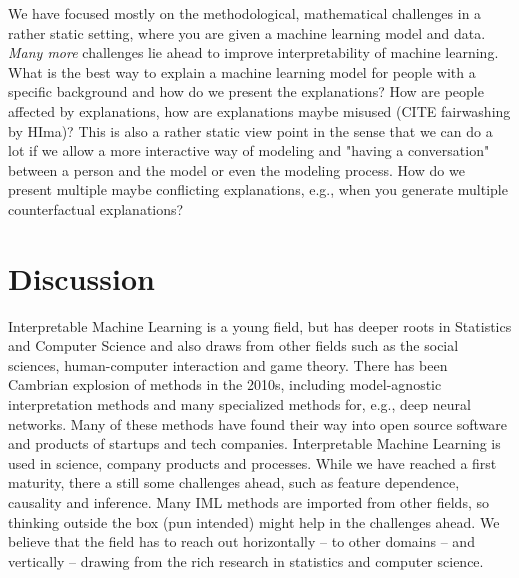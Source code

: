 \documentclass[runningheads]{llncs}
\begin{document}
We have focused mostly on the methodological, mathematical challenges in a rather static setting, where you are given a machine learning model and data.
\textit{Many more} challenges lie ahead to improve interpretability of machine learning.
What is the best way to explain a machine learning model for people with a specific background and how do we present the explanations?
How are people affected by explanations, how are explanations maybe misused (CITE fairwashing by HIma)?
This is also a rather static view point in the sense that we can do a lot if we allow a more interactive way of modeling and "having a conversation" between a person and the model or even the modeling process.
How do we present multiple maybe conflicting explanations, e.g., when you generate multiple counterfactual explanations?

\section{Discussion}

Interpretable Machine Learning is a young field, but has deeper roots in Statistics and Computer Science and also draws from other fields such as the social sciences, human-computer interaction and game theory.
There has been Cambrian explosion of methods in the 2010s, including model-agnostic interpretation methods and many specialized methods for, e.g., deep neural networks.
Many of these methods have found their way into open source software and products of startups and tech companies.
Interpretable Machine Learning is used in science, company products and processes.
While we have reached a first maturity, there a still some challenges ahead, such as feature dependence, causality and inference.
Many IML methods are imported from other fields, so thinking outside the box (pun intended) might help in the challenges ahead.
We believe that the field has to reach out horizontally -- to other domains -- and vertically -- drawing from the rich research in statistics and computer science.


%
%
%
% 
%

\vskip 0.2in


\end{document}
